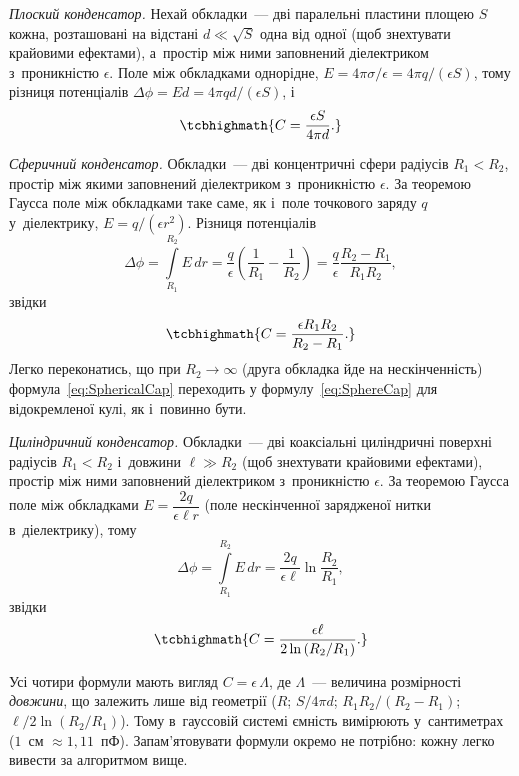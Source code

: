 \emph{Плоский конденсатор.} Нехай обкладки~--- дві паралельні пластини площею $S$ кожна,
розташовані на відстані $d \ll \sqrt{S}$ одна від одної (щоб знехтувати крайовими
ефектами), а~простір між ними заповнений діелектриком з~проникністю $\epsilon$. Поле між
обкладками однорідне, $E = 4\pi\sigma/\epsilon = 4\pi q /(\epsilon S)$, тому різниця
потенціалів $\Delta\phi = Ed = 4\pi qd/(\epsilon S)$, і
\begin{equation}\label{eq:FlatCap}
	\tcbhighmath{
		C = \frac{\epsilon S}{4\pi d}.
	}
\end{equation}

\emph{Сферичний конденсатор.} Обкладки~--- дві концентричні сфери радіусів $R_1 < R_2$,
простір між якими заповнений діелектриком з~проникністю $\epsilon$. За теоремою Гаусса
поле між обкладками таке саме, як і~поле точкового заряду $q$ у~діелектрику, $E =
q/(\epsilon r^2)$. Різниця потенціалів
\begin{equation*}
	\Delta\phi = \int\limits_{R_1}^{R_2} E\, dr = \frac{q}{\epsilon}\left(\frac1{R_1} - \frac1{R_2}\right) = \frac{q}{\epsilon}\frac{R_2 - R_1}{R_1
		R_2},
\end{equation*}
звідки
\begin{equation}\label{eq:SphericalCap}
	\tcbhighmath{
		C = \frac{\epsilon R_1 R_2}{R_2 - R_1}.
	}
\end{equation}
Легко переконатись, що при $R_2 \to \infty$ (друга обкладка йде на нескінченність)
формула~\eqref{eq:SphericalCap} переходить у формулу~\eqref{eq:SphereCap} для відокремленої
кулі, як і~повинно бути.

\emph{Циліндричний конденсатор.} Обкладки~--- дві коаксіальні циліндричні поверхні
радіусів $R_1 < R_2$ і~довжини $\ell \gg R_2$ (щоб знехтувати крайовими ефектами), простір
між ними заповнений діелектриком з~проникністю $\epsilon$. За теоремою Гаусса поле між
обкладками $E = \dfrac{2q}{\epsilon \ell r}$ (поле нескінченної зарядженої нитки
в~діелектрику), тому
\begin{equation*}
	\Delta\phi = \int\limits_{R_1}^{R_2} E\, dr = \frac{2q}{\epsilon\ell}\ln\frac{R_2}{R_1},
\end{equation*}
звідки
\begin{equation}\label{eq:CylindricalCap}
	\tcbhighmath{
		C = \frac{\epsilon \ell}{2\ln\left(R_2/R_1\right)}.
	}
\end{equation}

Усі чотири формули мають вигляд $C=\epsilon\,\Lambda$, де $\Lambda$~--- величина
розмірності \emph{довжини}, що залежить лише від геометрії ($R$; $S/4\pi d$;
$R_1R_2/(R_2-R_1)$; $\ell/2\ln(R_2/R_1)$). Тому в~гауссовій системі ємність вимірюють
у~сантиметрах ($1$~см $\approx 1{,}11$~пФ). Запам'ятовувати формули окремо не потрібно:
кожну легко вивести за алгоритмом вище.

